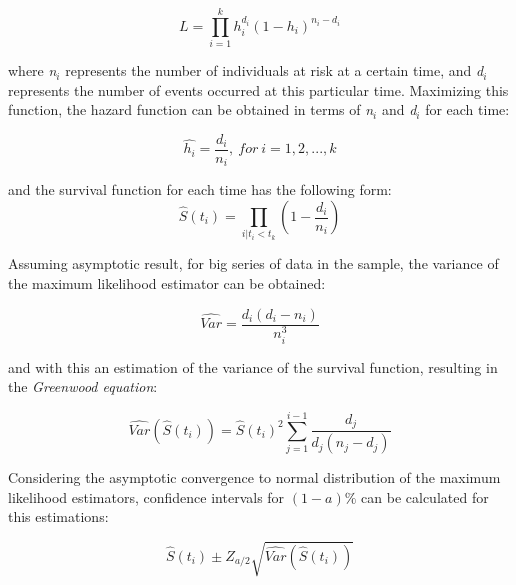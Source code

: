 \documentclass[11pt]{book} %
\begin{document}
    \begin{equation}
      L = \prod_{i=1}^k h_i^{d_i}(1-h_i)^{n_i-d_i}
      \label{eq:km-likelihood-function}
    \end{equation}

    where \emph{n$_i$} represents the number of individuals at risk at a certain time, and \emph{d$_i$} represents the number of events occurred at this particular time. Maximizing this function, the hazard function can be obtained in terms of \emph{n$_i$} and \emph{d$_i$} for each time:

    \begin{equation}
      \widehat{h_i}=\frac{d_i}{n_i}, \ for \ i = 1,2,...,k
      \label{eq:km-hazard-function}
    \end{equation}

    and the survival function for each time has the following form:
    \begin{equation}
      \widehat{S}(t_i) = \prod_{i | t_i < t_k}(1 - \frac{d_i}{n_i})
      \label{eq:km-survival-function}
    \end{equation}

    Assuming asymptotic result, for big series of data in the sample, the variance of the maximum likelihood estimator can be obtained:

    \begin{equation}
      \widehat{Var} = \frac{d_i(d_i-n_i)}{n_i^3}
      \label{eq:km-havar-variance}
    \end{equation}

    and with this an estimation of the variance of the survival function, resulting in the \emph{Greenwood equation}:

    \begin{equation}
      \widehat{Var}(\widehat{S}(t_i)) = \widehat{S}(t_i)^2 \sum_{j=1}^{i-1} \frac{d_j}{d_j(n_j-d_j)}
      \label{eq:km-greenwood-eq}
    \end{equation}

    Considering the asymptotic convergence to normal distribution of the maximum likelihood estimators, confidence intervals for $(1 - a)\%$ can be calculated for this estimations:

    \begin{equation}
      \widehat{S}(t_i)\pm Z_{a/2}\sqrt{\widehat{Var}(\widehat{S}(t_i))}
      \label{eq:km-confidence-intervals}
    \end{equation}
\end{document}
